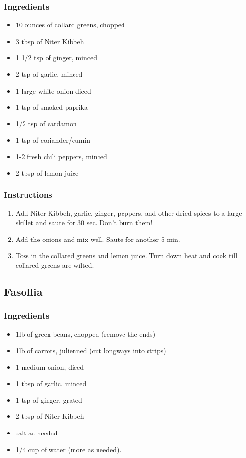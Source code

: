 \documentclass[11pt]{article}
\begin{document}
\subsubsection*{Ingredients}
\label{sec:orgfebd55a}
\begin{itemize}
\item 10 ounces of collard greens, chopped
\item 3 tbsp of Niter Kibbeh
\item 1 1/2 tsp of ginger, minced
\item 2 tsp of garlic, minced
\item 1 large white onion diced
\item 1 tsp of smoked paprika
\item 1/2 tsp of cardamon
\item 1 tsp of coriander/cumin
\item 1-2 fresh chili peppers, minced
\item 2 tbsp of lemon juice
\end{itemize}
\subsubsection*{Instructions}
\label{sec:orga50aedd}
\begin{enumerate}
\item Add Niter Kibbeh, garlic, ginger, peppers, and other dried spices to a large skillet and saute for 30 sec. Don't burn them!
\item Add the onions and mix well. Saute for another 5 min.
\item Toss in the collared greens and lemon juice. Turn down heat and cook till collared greens are wilted.
\end{enumerate}

\subsection{Fasollia}
\label{sec:org2a7f672}
\subsubsection*{Ingredients}
\label{sec:orgee04778}
\begin{itemize}
\item 1lb of green beans, chopped (remove the ends)
\item 1lb of carrots, julienned (cut longways into strips)
\item 1 medium onion, diced
\item 1 tbsp of garlic, minced
\item 1 tsp of ginger, grated
\item 2 tbsp of Niter Kibbeh
\item salt as needed
\item 1/4 cup of water (more as needed).
\end{itemize}
\end{document}

